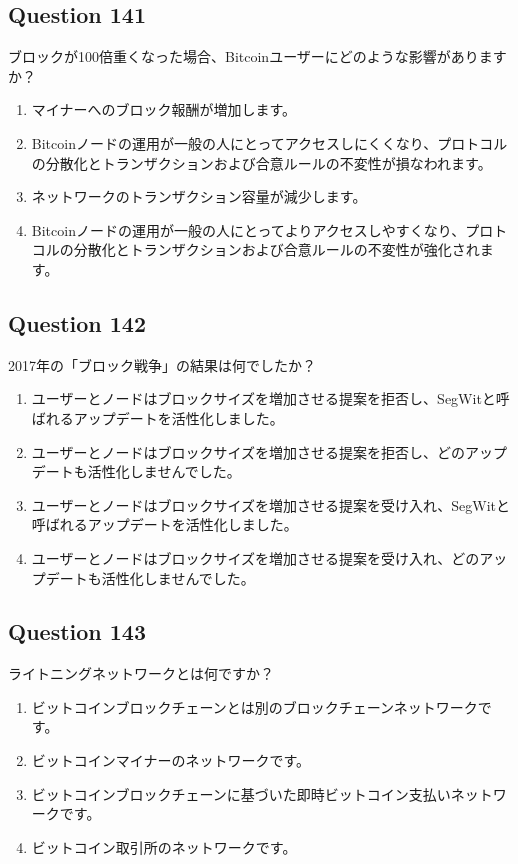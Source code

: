 \documentclass[12pt,a4paper]{article}
\begin{document}
\bigskip


\subsection*{Question 141}
ブロックが100倍重くなった場合、Bitcoinユーザーにどのような影響がありますか？

\begin{enumerate}[label=\Alph*., leftmargin=*]
\item マイナーへのブロック報酬が増加します。
\item Bitcoinノードの運用が一般の人にとってアクセスしにくくなり、プロトコルの分散化とトランザクションおよび合意ルールの不変性が損なわれます。
\item ネットワークのトランザクション容量が減少します。
\item Bitcoinノードの運用が一般の人にとってよりアクセスしやすくなり、プロトコルの分散化とトランザクションおよび合意ルールの不変性が強化されます。
\end{enumerate}

\bigskip


\subsection*{Question 142}
2017年の「ブロック戦争」の結果は何でしたか？

\begin{enumerate}[label=\Alph*., leftmargin=*]
\item ユーザーとノードはブロックサイズを増加させる提案を拒否し、SegWitと呼ばれるアップデートを活性化しました。
\item ユーザーとノードはブロックサイズを増加させる提案を拒否し、どのアップデートも活性化しませんでした。
\item ユーザーとノードはブロックサイズを増加させる提案を受け入れ、SegWitと呼ばれるアップデートを活性化しました。
\item ユーザーとノードはブロックサイズを増加させる提案を受け入れ、どのアップデートも活性化しませんでした。
\end{enumerate}

\bigskip


\subsection*{Question 143}
ライトニングネットワークとは何ですか？

\begin{enumerate}[label=\Alph*., leftmargin=*]
\item ビットコインブロックチェーンとは別のブロックチェーンネットワークです。
\item ビットコインマイナーのネットワークです。
\item ビットコインブロックチェーンに基づいた即時ビットコイン支払いネットワークです。
\item ビットコイン取引所のネットワークです。
\end{enumerate}
\end{document}
